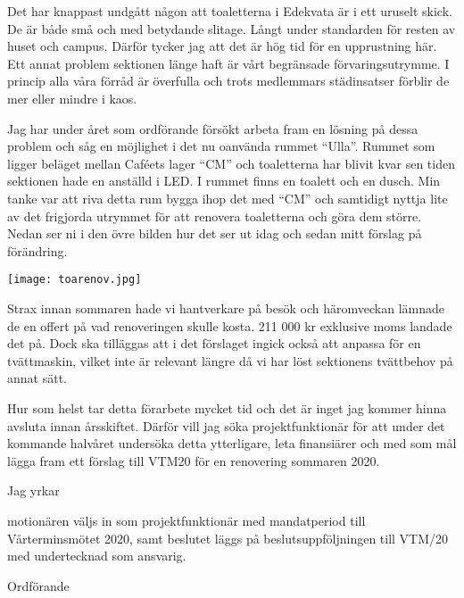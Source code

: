 \documentclass[../_main/handlingar.tex]{subfiles}
\begin{document}

Det har knappast undgått någon att toaletterna i Edekvata är i ett uruselt skick. De är både små och med betydande slitage. Långt under standarden för resten av huset och campus. 
Därför tycker jag att det är hög tid för en upprustning här. Ett annat problem sektionen länge haft är vårt begränsade förvaringsutrymme. I princip alla våra förråd är överfulla och trots medlemmars städinsatser förblir de mer eller mindre i kaos. 

Jag har under året som ordförande försökt arbeta fram en lösning på dessa problem och såg en möjlighet i det nu oanvända rummet “Ulla”. Rummet som ligger beläget mellan Caféets lager “CM” och toaletterna har blivit kvar sen tiden sektionen hade en anställd i LED. I rummet finns en toalett och en dusch. Min tanke var att riva detta rum bygga ihop det med “CM” och samtidigt nyttja lite av det frigjorda utrymmet för att renovera toaletterna och göra dem större. Nedan ser ni i den övre bilden hur det ser ut idag och sedan mitt förslag på förändring. 

\begin{center}
    \texttt{[image: toarenov.jpg]}
\end{center}

\newpage  
Strax innan sommaren hade vi hantverkare på besök och häromveckan lämnade de en offert på vad renoveringen skulle kosta. 211 000 kr exklusive moms landade det på. Dock ska tilläggas att i det förslaget ingick också att anpassa för en tvättmaskin, vilket inte är relevant längre då vi har löst sektionens tvättbehov på annat sätt. 

Hur som helst tar detta förarbete mycket tid och det är inget jag kommer hinna avsluta innan årsskiftet. Därför vill jag söka projektfunktionär för att under det kommande halvåret undersöka detta ytterligare, leta finansiärer och med som mål lägga fram ett förslag till VTM20 för en renovering sommaren 2020.
  
Jag yrkar

\begin{attsatser}
    \att motionären väljs in som projektfunktionär med mandatperiod till Vårterminsmötet 2020, samt 
    \att beslutet läggs på beslutsuppföljningen till VTM/20 med undertecknad som ansvarig.
    
\end{attsatser}

\begin{signatures}{1}
    \isekt
    \signature{Edvard Carlsson}{Ordförande}
\end{signatures}
\end{document}
